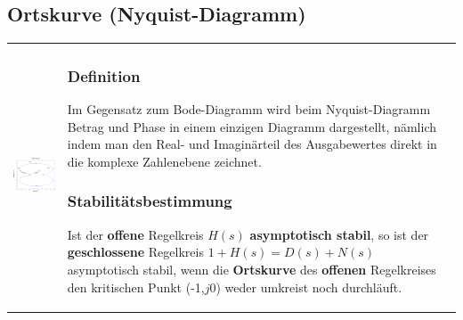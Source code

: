 \subsection{Ortskurve (Nyquist-Diagramm)  }
\begin{tabular}{ll}
	\parbox{7cm}{
		\includegraphics[width=7cm]{./images/nyquist.png}
	}
	& \parbox{11cm}{
		\subsubsection{Definition}
		Im Gegensatz zum Bode-Diagramm wird beim Nyquist-Diagramm Betrag und Phase in
		einem einzigen Diagramm dargestellt, nämlich indem man den Real- und
		Imaginärteil des Ausgabewertes direkt in die komplexe Zahlenebene zeichnet.
		
		\subsubsection{Stabilitätsbestimmung}
		Ist der {\bf offene} Regelkreis $H(s)$ {\bf asymptotisch
		stabil}, so ist der {\bf geschlossene}
		Regelkreis $1+H(s)=D(s)+N(s)$ asymptotisch stabil, wenn die {\bf
		Ortskurve} des {\bf offenen} Regelkreises den kritischen Punkt
		(-1,$j0$) weder umkreist noch durchl\"auft.
	}
\end{tabular}


